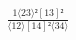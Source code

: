 \documentclass[varwidth, border=5pt]{standalone}
\begin{document}
\begin{my}
$\begin{gathered}
\scriptscriptstyle\frac{1⟨23⟩²[13]²}{⟨12⟩[14]²⟨34⟩}
\end{gathered}$
\end{my}
\end{document}
